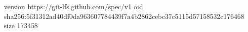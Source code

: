 version https://git-lfs.github.com/spec/v1
oid sha256:5f31312ad40df0da963607784439f7a4b2862cebc37c5115d57158532c176468
size 173458
